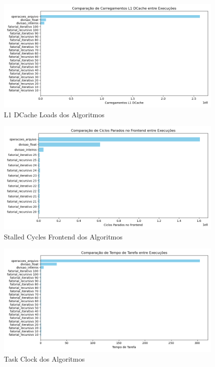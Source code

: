 \documentclass[12pt]{article}
\begin{document}
\begin{figure}[H]
    \centering
    \includegraphics[width=\linewidth]{resultados/l1_dcache_loads.png}
    \caption{L1 DCache Loads dos Algoritmos}
    \label{fig:l1_dcache_loads}
\end{figure}

\begin{figure}[H]
    \centering
    \includegraphics[width=\linewidth]{resultados/stalled_cycles_frontend.png}
    \caption{Stalled Cycles Frontend dos Algoritmos}
    \label{fig:stalled_cycles_frontend}
\end{figure}

\begin{figure}[H]
    \centering
    \includegraphics[width=\linewidth]{resultados/task_clock.png}
    \caption{Task Clock dos Algoritmos}
    \label{fig:task_clock}
\end{figure}
\end{document}

